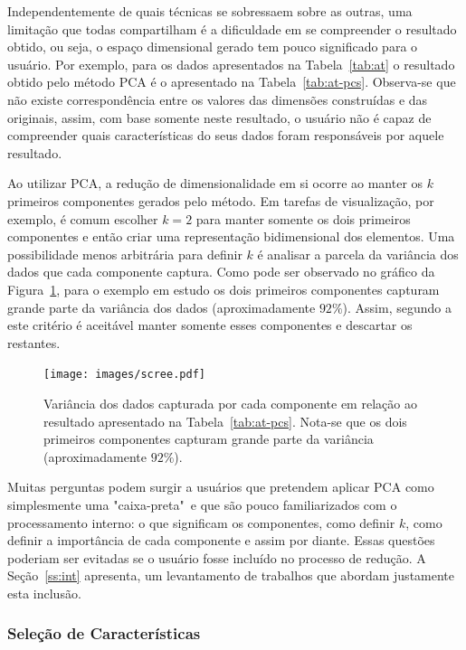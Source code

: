 Independentemente de quais técnicas se sobressaem sobre as
outras, uma limitação que todas compartilham é a dificuldade
em se compreender o resultado obtido, ou seja, o espaço
dimensional gerado tem pouco significado para o usuário. Por
exemplo, para os dados apresentados na Tabela~\ref{tab:at} o
resultado obtido pelo método PCA é o apresentado na
Tabela~\ref{tab:at-pcs}. Observa-se que não existe
correspondência entre os valores das dimensões construídas e
das originais, assim, com base somente neste resultado, o
usuário não é capaz de compreender quais características do
seus dados foram responsáveis por aquele resultado.

Ao utilizar PCA, a redução de dimensionalidade em si ocorre
ao  manter os $k$ primeiros componentes gerados pelo método.
Em tarefas de visualização, por exemplo, é comum escolher
$k=2$ para manter somente os dois primeiros componentes e
então criar uma representação bidimensional dos elementos.
Uma possibilidade menos arbitrária para definir $k$
é analisar a parcela da variância dos dados que cada
componente captura. Como pode ser observado no gráfico da
Figura~\ref{fig:scree}, para o exemplo em estudo os dois
primeiros componentes capturam grande parte da variância dos
dados (aproximadamente $92\%$). Assim, segundo a este
critério é aceitável manter somente esses componentes e
descartar os restantes. 

\begin{figure}[h!]
    \centering
    \texttt{[image: images/scree.pdf]}
    \caption[Variância capturada pelos PCs]{Variância dos
        dados capturada por cada componente em relação ao
        resultado apresentado na Tabela~\ref{tab:at-pcs}.
        Nota-se que os dois primeiros componentes capturam
        grande parte da variância (aproximadamente $92\%$).}
    \label{fig:scree}
\end{figure}

Muitas perguntas podem surgir a usuários que pretendem
aplicar PCA como simplesmente uma "caixa-preta"~e que são
pouco familiarizados com o processamento interno: o que
significam os componentes, como definir $k$, como definir a
importância de cada componente e assim por diante. Essas
questões poderiam ser evitadas se o usuário fosse incluído
no processo de redução. A Seção~\ref{ss:int} apresenta, um
levantamento de trabalhos que abordam justamente esta
inclusão.

\subsubsection{Seleção de Características} 

